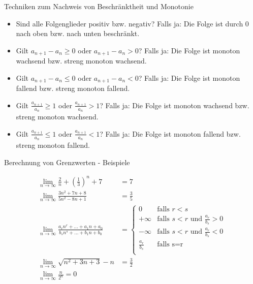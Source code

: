 \begin{frame}{Techniken zum Nachweis von Beschränktheit und Monotonie}
	\begin{itemize}
		\item Sind alle Folgenglieder positiv bzw. negativ? Falls ja: Die Folge ist durch 0 nach oben bzw. nach unten beschränkt.
		\item Gilt $a_{n+1} - a_{n} \geq 0$ oder $a_{n+1} - a_{n} > 0$? Falls ja: Die Folge ist monoton wachsend bzw. streng monoton wachsend.
		\item Gilt $a_{n+1} - a_{n} \leq 0$ oder $a_{n+1} - a_{n} < 0$? Falls ja: Die Folge ist monoton fallend bzw. streng monoton fallend.
		\item Gilt $\frac{a_{n+1}}{a_{n}} \geq 1$ oder $\frac{a_{n+1}}{a_{n}} > 1$? Falls ja: Die Folge ist monoton wachsend bzw. streng monoton wachsend.
		\item Gilt $\frac{a_{n+1}}{a_{n}} \leq 1$ oder $\frac{a_{n+1}}{a_{n}} < 1$? Falls ja: Die Folge ist monoton fallend bzw. streng monoton fallend.
	\end{itemize}
\end{frame}

\begin{frame}{Berechnung von Grenzwerten - Beispiele}
	\begin{example}
		\begin{align*}
		\lim_{n \to \infty} \frac{2}{n} + \left(\frac{1}{3}\right)^{n} +7 & = 7 \\
		\lim_{n \to \infty} \frac{3n^{2} +7n + 8}{5n^{2} -8n +1} & = \frac{3}{5} \\
		\lim_{n \to \infty} \frac{a_{r} n^{r} + \ldots + a_{1} n + a_{0}}{b_{s} n^{s} + \ldots + b_{1} n + b_{0}} & = \begin{cases}
		0 & \text{falls } r <s \\
		+\infty & \text{falls } s<r \text{ und } \frac{a_{r}}{b_{s}} > 0 \\
		-\infty & \text{falls } s<r \text{ und } \frac{a_{r}}{b_{s}} < 0 \\
		\frac{a_{r}}{b_{s}} & \text{falls s=r} \\
		\end{cases} \\
		\lim_{n \to \infty} \sqrt{n^{2}+3n+3} -n & = \frac{3}{2} \\
		\lim_{n \to \infty} \frac{n}{2^{n}} = 0
 		\end{align*}
	\end{example}
\end{frame} 

